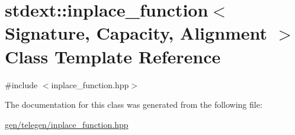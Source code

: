 \hypertarget{classstdext_1_1inplace__function}{}\section{stdext\+:\+:inplace\+\_\+function$<$ Signature, Capacity, Alignment $>$ Class Template Reference}
\label{classstdext_1_1inplace__function}


{\ttfamily \#include $<$inplace\+\_\+function.\+hpp$>$}



The documentation for this class was generated from the following file\+:\begin{DoxyCompactItemize}
\item 
\hyperlink{gen_2telegen_2inplace__function_8hpp}{gen/telegen/inplace\+\_\+function.\+hpp}\end{DoxyCompactItemize}
